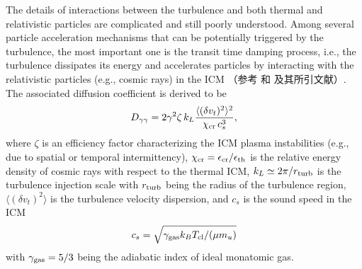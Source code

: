 The details of interactions between the turbulence and both thermal and
relativistic particles are complicated and still poorly understood.
Among several particle acceleration mechanisms that can be potentially
triggered by the turbulence, the most important one is the transit time
damping process, i.e., the turbulence dissipates its energy and
accelerates particles by interacting with the relativistic particles
(e.g., cosmic rays) in the ICM
（参考  和  及其所引文献）.
The associated diffusion coefficient is derived to be
\cite{miniati2015,pinzke2017}
\begin{equation}
  \label{eq:dpp}
  D_{\gamma\gamma} = 2 \gamma^2 \zeta \,k_L
    \frac{\langle (\delta v_t)^2 \rangle^2}{\chi_{\mathrm{cr}} \, c_s^3},
\end{equation}
where
$\zeta$ is an efficiency factor characterizing the ICM plasma instabilities
(e.g., due to spatial or temporal intermittency),
$\chi_{\mathrm{cr}} = \epsilon_{\mathrm{cr}} / \epsilon_{\mathrm{th}}$ is the relative
energy density of cosmic rays with respect to the thermal ICM,
$k_L \simeq 2\pi / r_{\mathrm{turb}}$ is the turbulence injection scale
with $r_{\mathrm{turb}}$ being the radius of the turbulence region,
$\langle (\delta v_t)^2 \rangle$ is the turbulence velocity dispersion,
and $c_s$ is the sound speed in the ICM
\begin{equation}
  \label{eq:sound-speed}
  c_s = \sqrt{\gamma_{\mathrm{gas}} k_B T_{\mathrm{cl}} / (\mu m_u)}
\end{equation}
with $\gamma_{\mathrm{gas}} = 5/3$ being the adiabatic index
of ideal monatomic gas.

